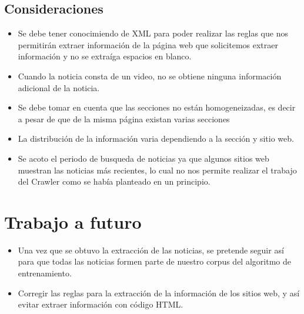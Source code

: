 \subsection{Consideraciones}
\begin{itemize}
  \item Se debe tener conocimiendo de XML para poder realizar las reglas que nos permitirán extraer información de la página web que solicitemos extraer 
  información y no se extraíga espacios en blanco.
  \item Cuando la noticia consta de un video, no se obtiene ninguna información adicional de la noticia.
  \item Se debe tomar en cuenta que las secciones no están homogeneizadas, es decir a pesar de que de la misma página existan varias secciones 
  \item La distribución de la información varia dependiendo a la sección y sitio web.
  \item Se acoto el periodo de busqueda de noticias ya que algunos sitios web muestran las noticias más recientes, lo cual no nos permite realizar 
  el trabajo del Crawler como se había planteado en un principio.
\end{itemize}

\section{Trabajo a futuro}
\begin{itemize}
  \item Una vez que se obtuvo la extracción de las noticias, se pretende seguir así para que todas las noticias formen parte de nuestro corpus del 
  algoritmo de entrenamiento.
  \item Corregir las reglas para la extracción de la información de los sitios web, y así evitar extraer información con código HTML.
\end{itemize}

